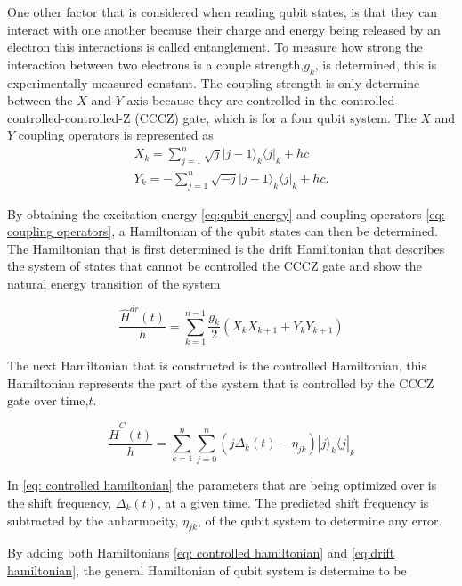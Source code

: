 One other factor that is considered when reading qubit states, is that they can interact with one another because their charge and energy being released by an electron this interactions is called entanglement. To measure how strong the interaction between two electrons is a couple strength,$g_k$, is determined, this is experimentally measured constant. The coupling strength is only determine between the $X$ and $Y$ axis because they are controlled in the controlled-controlled-controlled-Z
(CCCZ) gate, which is for a four qubit system. 
The $X$ and $Y$ coupling operators \cite{Ghosh2013} is represented as
\begin{gather}
    \label{eq: coupling operators}
  X_k = \sum^n_{j=1} \sqrt{j}\big| j-1 \big\rangle_k \big\langle j |_k + hc \\
Y_k = -\sum^n_{j=1} \sqrt{-j}\big| j-1 \big\rangle_k  \big\langle j |_k + hc.
\end{gather}

By obtaining the excitation energy \ref{eq:qubit energy} and coupling operators \ref{eq: coupling operators}, a Hamiltonian of the qubit states can then be determined. The Hamiltonian that is first determined is the drift Hamiltonian that describes the system of states that cannot be controlled the CCCZ gate and show the natural energy transition of the system

\begin{equation}
    \label{eq: drift hamiltonian}
  \frac{\hat{H}^{dr}(t)}{h} = \sum^{n-1}_{k=1} \frac{g_k}{2} (X_kX_{k+1}+Y_kY_{k+1})
 \end{equation}

The next Hamiltonian that is constructed is the controlled Hamiltonian, this Hamiltonian represents the part of the system that is controlled by the CCCZ gate over time,$t$. 
 
\begin{equation}
  \label{eq:controlled hamiltonian}
  \frac{\hat{H}^{C}(t)}{h} = \sum^n_{k=1} \sum^n_{j=0} (j\Delta_k(t)-\eta_{jk}) |j \big\rangle_k \big\langle j|_k
\end{equation}

In \ref{eq: controlled hamiltonian} the parameters that are being optimized over is the shift frequency, $\Delta_k(t)$, at a given time. The predicted shift frequency is subtracted by the anharmocity, $\eta_{jk}$, of the qubit system to determine any error.  

By adding both Hamiltonians \ref{eq: controlled hamiltonian} and \ref{eq:drift hamiltonian}, the general Hamiltonian of qubit system \cite{Zahedinejad2015} is determine to be

